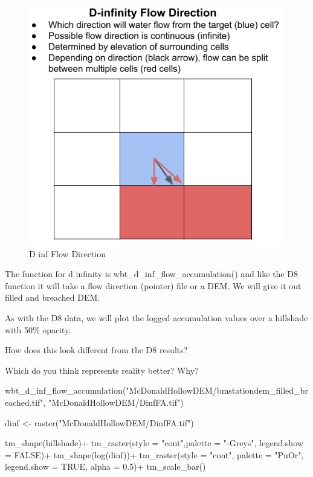 \documentclass[
]{book}
\newenvironment{Shaded}{\begin{snugshade}}{\end{snugshade}}
\newcommand{\AttributeTok}[1]{\textcolor[rgb]{0.77,0.63,0.00}{#1}}
\newcommand{\ConstantTok}[1]{\textcolor[rgb]{0.00,0.00,0.00}{#1}}
\newcommand{\FloatTok}[1]{\textcolor[rgb]{0.00,0.00,0.81}{#1}}
\newcommand{\FunctionTok}[1]{\textcolor[rgb]{0.00,0.00,0.00}{#1}}
\newcommand{\NormalTok}[1]{#1}
\newcommand{\OtherTok}[1]{\textcolor[rgb]{0.56,0.35,0.01}{#1}}
\newcommand{\SpecialCharTok}[1]{\textcolor[rgb]{0.00,0.00,0.00}{#1}}
\newcommand{\StringTok}[1]{\textcolor[rgb]{0.31,0.60,0.02}{#1}}
\begin{document}
\begin{figure}
\centering
\includegraphics{images/dinf-flow direction.png}
\caption{D inf Flow Direction}
\end{figure}

The function for d infinity is wbt\_d\_inf\_flow\_accumulation() and like the D8 function it will take a flow direction (pointer) file or a DEM. We will give it out filled and breached DEM.

As with the D8 data, we will plot the logged accumulation values over a hillshade with 50\% opacity.

How does this look different from the D8 results?

Which do you think represents reality better? Why?

\begin{Shaded}
\begin{Highlighting}[]
\FunctionTok{wbt\_d\_inf\_flow\_accumulation}\NormalTok{(}\StringTok{"McDonaldHollowDEM/bmstationdem\_filled\_breached.tif"}\NormalTok{,}
                         \StringTok{"McDonaldHollowDEM/DinfFA.tif"}\NormalTok{)}

\NormalTok{dinf }\OtherTok{\textless{}{-}} \FunctionTok{raster}\NormalTok{(}\StringTok{"McDonaldHollowDEM/DinfFA.tif"}\NormalTok{)}

\FunctionTok{tm\_shape}\NormalTok{(hillshade)}\SpecialCharTok{+}
  \FunctionTok{tm\_raster}\NormalTok{(}\AttributeTok{style =} \StringTok{"cont"}\NormalTok{,}\AttributeTok{palette =} \StringTok{"{-}Greys"}\NormalTok{, }\AttributeTok{legend.show =} \ConstantTok{FALSE}\NormalTok{)}\SpecialCharTok{+}
\FunctionTok{tm\_shape}\NormalTok{(}\FunctionTok{log}\NormalTok{(dinf))}\SpecialCharTok{+}
  \FunctionTok{tm\_raster}\NormalTok{(}\AttributeTok{style =} \StringTok{"cont"}\NormalTok{, }\AttributeTok{palette =} \StringTok{"PuOr"}\NormalTok{, }\AttributeTok{legend.show =} \ConstantTok{TRUE}\NormalTok{, }\AttributeTok{alpha =} \FloatTok{0.5}\NormalTok{)}\SpecialCharTok{+}
  \FunctionTok{tm\_scale\_bar}\NormalTok{()}
\end{Highlighting}
\end{Shaded}
\end{document}
